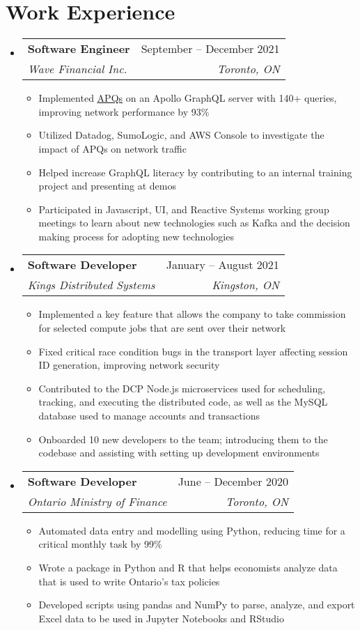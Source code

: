 \documentclass[letterpaper,11pt]{article}
\makeatletter
\newcommand{\resumeItem}[1]{
  \item\small{
    {#1 \vspace{-2pt}}
  }
}
\newcommand{\resumeSubheading}[4]{
  \vspace{-2pt}\item
    \begin{tabular*}{0.97\textwidth}[t]{l@{\extracolsep{\fill}}r}
      \textbf{#1} & #2 \\
      \textit{\small#3} & \textit{\small #4} \\
    \end{tabular*}\vspace{-7pt}
}
\newcommand{\resumeSubHeadingListStart}{\begin{itemize}[leftmargin=0.15in, label={}]}
\newcommand{\resumeSubHeadingListEnd}{\end{itemize}}
\newcommand{\resumeItemListStart}{\begin{itemize}}
\newcommand{\resumeItemListEnd}{\end{itemize}\vspace{-5pt}}
\makeatother
\begin{document}
\section{Work Experience}
  \resumeSubHeadingListStart
    \resumeSubheading
      {Software Engineer}{September -- December 2021}
      {Wave Financial Inc.}{Toronto, ON}
      \resumeItemListStart 
        \resumeItem{Implemented \href{https://www.apollographql.com/docs/apollo-server/performance/apq/}{\underline{APQs}} on an Apollo GraphQL server with 140+ queries, improving network performance by 93\%}
        \resumeItem{Utilized Datadog, SumoLogic, and AWS Console to investigate the impact of APQs on network traffic}
        \resumeItem{Helped increase GraphQL literacy by contributing to an internal training project and presenting at demos}
        \resumeItem{Participated in Javascript, UI, and Reactive Systems working group meetings to learn about new technologies such as Kafka and the decision making process for adopting new technologies}
      \resumeItemListEnd
    
    \resumeSubheading
      {Software Developer}{January -- August 2021}
      {Kings Distributed Systems}{Kingston, ON}
      \resumeItemListStart
        \resumeItem{Implemented a key feature that allows the company to take commission for selected compute jobs that are sent over their network}
        \resumeItem{Fixed critical race condition bugs in the transport layer affecting session ID generation, improving network security}
        \resumeItem{Contributed to the DCP Node.js microservices used for scheduling, tracking, and executing the distributed code, as well as the MySQL database used to manage accounts and transactions}
        \resumeItem{Onboarded 10 new developers to the team; introducing them to the codebase and assisting with setting up development environments}
      \resumeItemListEnd

    \resumeSubheading
      {Software Developer}{June -- December 2020}
      {Ontario Ministry of Finance}{Toronto, ON}
      \resumeItemListStart
        \resumeItem{Automated data entry and modelling using Python, reducing time for a critical monthly task by 99\%}
        \resumeItem{Wrote a package in Python and R that helps economists analyze data that is used to write Ontario's tax policies}
        \resumeItem{Developed scripts using pandas and NumPy to parse, analyze, and export Excel data to be used in Jupyter Notebooks and RStudio}
      \resumeItemListEnd
  \resumeSubHeadingListEnd
\end{document}
